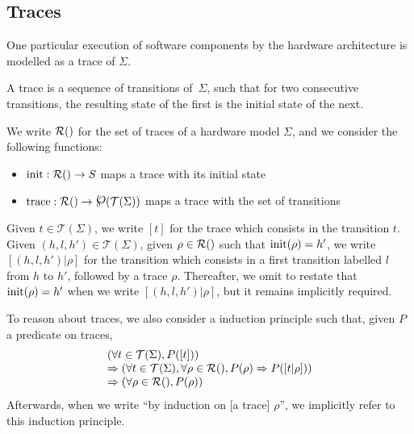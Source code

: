 \subsection{Traces}
\label{subsec:speccert:trace}

One particular execution of software components by the hardware architecture is
modelled as a trace of $\Sigma$.

\begin{definition}[Traces]
  A trace is a sequence of transitions of~$\Sigma$, such that for two
  consecutive transitions, the resulting state of the first is the initial state
  of the next.

  We write $\pathesLTS{Ez}$ for the set of traces of a hardware model $\Sigma$,
  and we consider the following functions:
  \begin{itemize}
  \item $\func{init} : \pathesLTS{Ez} \rightarrow S$ maps a trace with its
    initial state
  \item
    $\func{trace} : \pathesLTS{Ez} \rightarrow \powerset(\mathcal{T}(\Sigma))$
    maps a trace with the set of transitions
  \end{itemize}

  Given $t \in \mathcal{T}(\Sigma)$, we write $[t]$ for the trace which consists
  in the transition $t$.
  Given $(h, l, h') \in \mathcal{T}(\Sigma)$, given $\rho \in \pathesLTS{Ez}$
  such that $\mathrm{init}(\rho) = h'$, we write $[(h, l, h')|\rho]$ for the
  transition which consists in a first transition labelled $l$ from $h$ to $h'$,
  followed by a trace $\rho$. Thereafter, we omit to restate that
  $\mathrm{init}(\rho) = h'$ when we write $[(h, l, h')|\rho]$, but it remains
  implicitly required.

  To reason about traces, we also consider a induction principle such that,
  given $P$ a predicate on traces,
  \[
    \begin{array}{l}
      (\forall t \in \mathcal{T}(\Sigma), P([t])) \\
      \Rightarrow (\forall t \in \mathcal{T}(\Sigma), \forall \rho \in
      \pathesLTS{Ez}, P(\rho) \Rightarrow P([t|\rho])) \\
      \Rightarrow (\forall \rho \in \pathesLTS{Ez}, P(\rho))
    \end{array}
  \]
  Afterwards, when we write ``by induction on [a trace] $\rho$'', we implicitly
  refer to this induction principle.
\end{definition}

